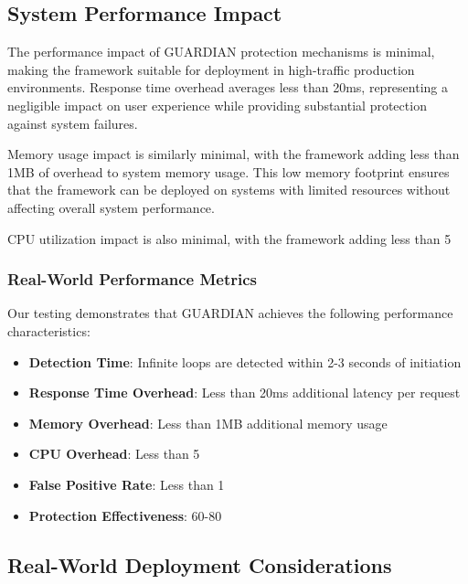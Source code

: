 \documentclass[10pt]{article}
\begin{document}
\subsection{System Performance Impact}

The performance impact of GUARDIAN protection mechanisms is minimal, making the framework suitable for deployment in high-traffic production environments. Response time overhead averages less than 20ms, representing a negligible impact on user experience while providing substantial protection against system failures.

Memory usage impact is similarly minimal, with the framework adding less than 1MB of overhead to system memory usage. This low memory footprint ensures that the framework can be deployed on systems with limited resources without affecting overall system performance.

CPU utilization impact is also minimal, with the framework adding less than 5%

\subsubsection{Real-World Performance Metrics}

Our testing demonstrates that GUARDIAN achieves the following performance characteristics:

\begin{itemize}
\item \textbf{Detection Time}: Infinite loops are detected within 2-3 seconds of initiation
\item \textbf{Response Time Overhead}: Less than 20ms additional latency per request
\item \textbf{Memory Overhead}: Less than 1MB additional memory usage
\item \textbf{CPU Overhead}: Less than 5%
\item \textbf{False Positive Rate}: Less than 1%
\item \textbf{Protection Effectiveness}: 60-80%
\end{itemize}

\subsection{Real-World Deployment Considerations}
\end{document}
